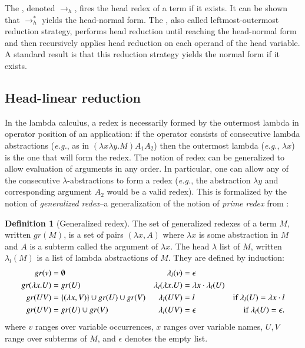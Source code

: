 \documentclass{elsarticle}
\makeatletter
\theoremstyle{plain}
\theoremstyle{definition}
\newtheorem{definition}{Definition}[section]
\theoremstyle{remark}
\renewcommand\eg{{\it e.g.\@\xspace}}
\makeatother
\begin{document}
The , denoted $\rightarrow_{h}$, fires the head redex of a term if it exists. It can be shown that $\rightarrow^*_{h}$ yields the head-normal form. The , also called leftmost-outermost reduction strategy, performs head reduction until reaching the head-normal form and then recursively applies head reduction on each operand of the head variable. A standard result is that this reduction strategy yields the normal form if it exists.


\subsection{Head-linear reduction}

In the lambda calculus, a redex is necessarily formed by the outermost lambda in operator position of an application: if the operator consists of consecutive lambda abstractions (\eg, as in $(\lambda x \lambda y . M) A_1 A_2$) then the outermost lambda (\eg, $\lambda x$) is the one that will form the redex. The notion of redex can be generalized to allow evaluation of arguments in any order. In particular, one can allow any of the consecutive $\lambda$-abstractions to form a redex (\eg, the abstraction $\lambda y$ and corresponding argument $A_2$ would be a valid redex). This is formalized by the notion of \emph{generalized redex}--a generalization of the notion of \emph{prime redex} from \cite{danos-head}:
\begin{definition}[Generalized redex]
\label{dfn:generalized_redex}
The set of generalized redexes of a term $M$, written $gr(M)$, is a set of pairs $(\lambda x, A)$ where $\lambda x$ is some abstraction in $M$ and $A$ is a subterm called the argument of $\lambda x$. The head $\lambda$ list of $M$, written $\lambda_l(M)$ is a list of lambda abstractions of $M$. They are defined by induction:
\begin{align*}
gr(v) &= \emptyset & \lambda_l(v) &= \epsilon\\
gr(\lambda x. U) &= gr(U) & \lambda_l(\lambda x. U) &= \lambda x \cdot \lambda_l(U) \\
gr(U V) &= \{ (\lambda x, V) \} \cup gr(U) \cup gr(V) &
\lambda_l(U V) &= l & \mbox{if $\lambda_l(U) = \lambda x \cdot l$} \\
gr(U V) &= gr(U) \cup gr(V) & \lambda_l(U V) &= \epsilon & \mbox{if $\lambda_l(U) = \epsilon$.}
\end{align*}
where $v$ ranges over variable occurrences, $x$ ranges over variable names, $U, V$ range over subterms of $M$, and $\epsilon$ denotes the empty list.
\end{definition}
\end{document}
